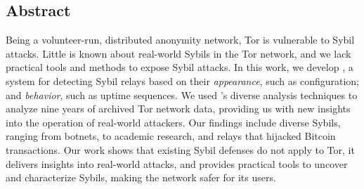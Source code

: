 \subsection*{Abstract}
Being a volunteer-run, distributed anonymity network, Tor is vulnerable to Sybil
attacks.  Little is known about real-world Sybils in the Tor network, and we
lack practical tools and methods to expose Sybil attacks.
%
In this work, we develop \emph{\sys}, a system for detecting Sybil relays based
on their \emph{appearance}, such as configuration; and \emph{behavior}, such as
uptime sequences.  We used \sys's diverse analysis techniques to analyze nine
years of archived Tor network data, providing us with new insights into the
operation of real-world attackers.  Our findings include diverse Sybils, ranging
from botnets, to academic research, and relays that hijacked Bitcoin
transactions.
%
Our work shows that existing Sybil defenses do not apply to Tor, it delivers
insights into real-world attacks, and provides practical tools to uncover and
characterize Sybils, making the network safer for its users.
